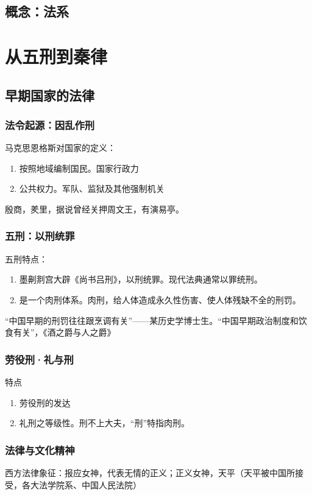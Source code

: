 \documentclass[twoside]{article}
\begin{document}
\subsection{概念：法系}

\section{从五刑到秦律}
\subsection{早期国家的法律}
\subsubsection{法令起源：因乱作刑}
马克思恩格斯对国家的定义：
\begin{enumerate}
	\item 按照地域编制国民。国家行政力
	\item 公共权力。军队、监狱及其他强制机关
\end{enumerate}
殷商，羑里，据说曾经关押周文王，有演易亭。
\subsubsection{五刑：以刑统罪}
五刑特点：
\begin{enumerate}
	\item 墨劓剕宫大辟《尚书吕刑》，以刑统罪。现代法典通常以罪统刑。
	\item 是一个肉刑体系。肉刑，给人体造成永久性伤害、使人体残缺不全的刑罚。
\end{enumerate}
``中国早期的刑罚往往跟烹调有关''——某历史学博士生。``中国早期政治制度和饮食有关''，《酒之爵与人之爵》\\
\subsubsection{劳役刑·礼与刑}
特点
\begin{enumerate}
	\item 劳役刑的发达
	\item 礼刑之等级性。刑不上大夫，``刑''特指肉刑。
\end{enumerate}
\subsubsection{法律与文化精神}
西方法律象征：报应女神，代表无情的正义；正义女神，天平（天平被中国所接受，各大法学院系、中国人民法院）\\
\end{document}
